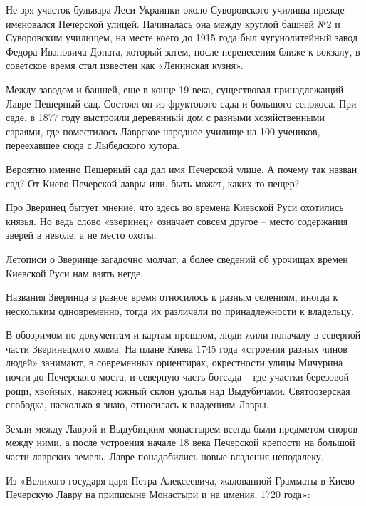 Не зря участок бульвара Леси Украинки около Суворовского училища прежде именовался Печерской улицей. Начиналась она между круглой башней №2 и Суворовским училищем, на месте коего до 1915 года был чугунолитейный завод Федора Ивановича Доната, который затем, после перенесения ближе к вокзалу, в советское время стал известен как «Ленинская кузня».

Между заводом и башней, еще в конце 19 века, существовал принадлежащий Лавре Пещерный сад. Состоял он из фруктового сада и большого сенокоса. При саде, в 1877 году выстроили деревянный дом с разными хозяйственными сараями, где поместилось Лаврское народное училище на 100 учеников, переехавшее сюда с Лыбедского хутора.

Вероятно именно Пещерный сад дал имя Печерской улице. А почему так назван сад? От Киево-Печерской лавры или, быть может, каких-то пещер?

Про Зверинец бытует мнение, что здесь во времена Киевской Руси охотились князья. Но ведь слово «зверинец» означает совсем другое – место содержания зверей в неволе, а не место охоты.

Летописи о Зверинце загадочно молчат, а более сведений об урочищах времен Киевской Руси нам взять негде.%

Названия Зверинца в разное время относилось к разным селениям, иногда к нескольким одновременно, тогда их различали по принадлежности к владельцу.

В обозримом по документам и картам прошлом, люди жили поначалу в северной части Зверинецкого холма. На плане Киева 1745 года «строения разных чинов людей» занимают, в современных ориентирах, окрестности улицы Мичурина почти до Печерского моста, и северную часть ботсада – где участки березовой рощи, хвойных, наконец южный склон удолья над Выдубичами. Святоозерская слободка, насколько я знаю, относилась к владениям Лавры.

Земли между Лаврой и Выдубицким монастырем всегда были предметом споров между ними, а после устроения начале 18 века Печерской крепости на большой части лаврских земель, Лавре понадобились новые владения неподалеку.

Из «Великого государя царя Петра Алексеевича, жалованной Грамматы в Киево-Печерскую Лавру на приписыне Монастыри и на имения. 1720 года»:

